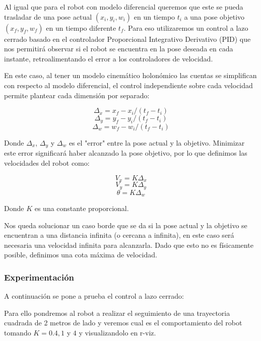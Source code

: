 Al igual que para el robot con modelo diferencial queremos que este se pueda trasladar de una pose actual $(x_i,y_i,w_i)$ en un tiempo $t_i$ a una pose objetivo $(x_f,y_f,w_f)$ en un tiempo diferente $t_f$. Para eso utilizaremos un control a lazo cerrado basado en el controlador Proporcional Integrativo Derivativo (PID) que nos permitirá observar si el robot se encuentra en la pose deseada en cada instante, retroalimentando el error a los controladores de velocidad.

En este caso, al tener un modelo cinemático holonómico las cuentas se simplifican con respecto al modelo diferencial, el control independiente sobre cada velocidad permite plantear cada  dimensión por separado:

$$\Delta_x = x_f - x_i / (t_f - t_i)$$
$$\Delta_y = y_f - y_i / (t_f - t_i)$$
$$\Delta_w = w_f - w_i / (t_f - t_i)$$

Donde $\Delta_x$, $\Delta_y$ y $\Delta_w$ es el "error" entre la pose actual y la objetivo. Minimizar este error significará haber alcanzado la pose objetivo, por lo que definimos las velocidades del robot como:

$$V_x = K \Delta_x $$
$$V_y = K \Delta_y $$
$$\theta = K \Delta_w $$

Donde $K$ es una constante proporcional.


Nos queda solucionar un caso borde que se da si la pose actual y la objetivo se encuentran a una distancia infinita (o cercana a infinita), en este caso será necesaria una velocidad infinita para alcanzarla. Dado que esto no es físicamente posible, definimos una cota máxima de velocidad.


\subsubsection{Experimentación}

A continuación se pone a prueba el control a lazo cerrado:

Para ello pondremos al robot a realizar el seguimiento de una trayectoria cuadrada de 2 metros de lado y veremos cual es el comportamiento del robot tomando $K=0.4,1$ y $4$ y visualizandolo en r-viz.

